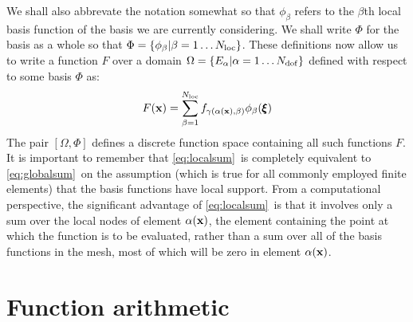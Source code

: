 \documentclass[a4paper, 11pt]{book}
\begin{document}
We shall also abbrevate the notation somewhat so that $\phi_\beta$ refers to
the $\beta$th local basis function of the basis we are currently
considering. We shall write $\Phi$ for the basis as a whole so that
$\Phi=\{\phi_\beta| \beta=1\ldots N_\mathrm{loc}\}$. These definitions now allow us
to write a function $F$ over a domain
$\Omega=\{E_\alpha|\alpha=1\ldots N_\mathrm{dof}\}$ defined with respect to some basis $\Phi$ as:
\begin{equation}\label{eq:localsum}
  F(\mathbf{x})=\sum_{\beta=1}^{N_\mathrm{loc}} f_{\gamma(\alpha(\mathbf{x}),\beta)}\phi_{\beta}(\pmb{\xi})
\end{equation}
The pair $[\Omega, \Phi]$ defines a discrete function space containing all
such functions $F$. It is important to remember that \eqref{eq:localsum}\ is
completely equivalent to \eqref{eq:globalsum}\ on the assumption (which is
true for all commonly employed finite elements) that the basis functions
have local support. From a computational perspective, the significant
advantage of \eqref{eq:localsum}\ is that it involves only a sum over the
local nodes of element $\alpha(\mathbf{x})$, the element containing the point at
which the function is to be evaluated, rather than a sum over all of the
basis functions in the mesh, most of which will be zero in element
$\alpha(\mathbf{x})$.

\section{Function arithmetic}
\end{document}
